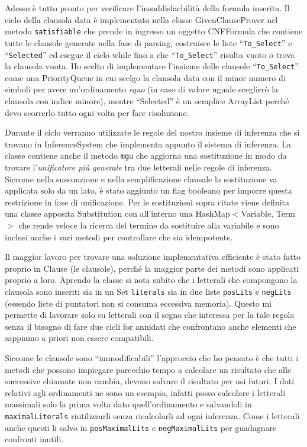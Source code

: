 \documentclass[a4paper,11pt]{article} %
\newcommand{\classe}{\textsf}
\newcommand{\metodo}{\texttt}
\newcommand{\campo}{\texttt}
\newcommand{\cod}{\lstset{basicstyle=\ttfamily}\lstinline}
\begin{document}
Adesso è tutto pronto per verificare l'insoddisfacbilità della formula inserita.
Il ciclo della clausola data %
è implementato nella classe
\classe{GivenClauseProver} nel metodo \metodo{satisfiable} che prende in ingresso
un oggetto \classe{CNFFormula} che contiene tutte le clausole generate nella
fase di parsing, costruisce le liste ``\campo{To\_Select}'' e ``\campo{Selected}'' ed esegue il
ciclo while fino a che ``\campo{To\_Select}'' risulta vuoto o trova la clausola vuota.
Ho scelto di implementare l'insieme delle clausole ``\campo{To\_Select}'' come una
\classe{PriorityQueue} in cui scelgo la clausola data con il minor numero
di simboli per avere un'ordinamento \emph{equo} (in caso di valore uguale
sceglierò la clausola con indice minore), mentre ``Selected'' è un
semplice ArrayList perché devo scorrerlo tutto ogni volta per fare risoluzione.

Durante il ciclo verranno utilizzate le regole del nostro insieme di inferenza
che si trovano in \classe{InferenceSystem} che
implementa appunto il sistema di inferenza.
La classe contiene anche il metodo \metodo{mgu} che
aggiorna una sostituzione in modo da trovare l'\emph{unificatore più generale} 
tra due letterali nelle regole di inferenza. Siccome nella sussunzione e nella
semplificazione clausale la sostituzione va applicata solo da un lato, è
stato aggiunto un flag booleano per imporre questa restrizione in fase di unificazione. 
Per le sostituzioni sopra citate viene definita una classe apposita \classe{Substitution}
con all'interno una \classe{HashMap}$<$\classe{Variable}, \classe{Term}$>$ che
rende veloce la ricerca del termine da sostituire alla variabile e sono inclusi
anche i vari metodi per controllare che sia idempotente.

Il maggior lavoro per trovare una soluzione implementativa efficiente è stato
fatto proprio in \classe{Clause} (le clausole), perché la maggior parte dei metodi sono applicati
proprio a loro. Aprendo la classe si nota subito che i letterali che compongono la clausola
sono inseriti
sia in un \classe{Set} \cod{literals} sia in due liste \cod{posLits} e \cod{negLits} (essendo
liste di puntatori non si consuma eccessiva memoria). Questo mi permette di 
lavorare solo su letterali con il segno che interessa per la tale regola senza
il bisogno di fare due cicli for annidati che confrontano anche elementi che
sappiamo a priori non essere compatibili. 

Siccome le clausole sono 
``immodificabili'' l'approccio che ho pensato è che tutti i metodi che 
possono impiegare parecchio tempo a calcolare un risultato che alle successive 
chiamate non cambia, devono salvare il risultato per usi futuri.
I dati relativi agli ordinamenti ne sono un esempio, infatti posso calcolare
i letterali massimali solo la prima volta dato quell'ordinamento e salvandoli in
\cod{maximalLiterals} riutilizzarli senza ricalcolarli ad ogni inferenza.
Come i letterali anche questi li salvo in \cod{posMaximalLits} e 
\cod{negMaximalLits} per guadagnare confronti inutili.
\end{document}
